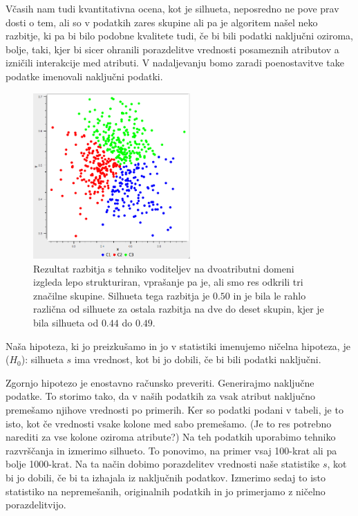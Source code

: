 Včasih nam tudi kvantitativna ocena, kot je silhueta, neposredno ne
pove prav dosti o tem, ali so v podatkih zares skupine ali pa je
algoritem našel neko razbitje, ki pa bi bilo podobne kvalitete tudi,
če bi bili podatki naključni oziroma, bolje, taki, kjer bi sicer
ohranili porazdelitve vrednosti posameznih atributov a izničili
interakcije med atributi. V nadaljevanju bomo zaradi poenostavitve
take podatke imenovali naključni podatki.

\begin{figure}[htbp]
\begin{center}
  \includegraphics[width=6cm]{slike/kmeans-wrong-scatter.png}
\caption{Rezultat razbitja s tehniko voditeljev na dvoatributni domeni
izgleda lepo strukturiran, vprašanje pa je, ali smo res odkrili tri
značilne skupine. Silhueta tega razbitja je $0.50$ in je bila le rahlo
različna od silhuete za ostala razbitja na dve do deset skupin, kjer
je bila silhueta od $0.44$ do $0.49$.}
\label{f-kmeans-hairball}
\end{center}
\end{figure}


Naša hipoteza, ki jo preizkušamo in jo v statistiki imenujemo ničelna
hipoteza, je ($H_0$): silhueta $s$ ima vrednost, kot bi jo dobili,
če bi bili podatki naključni.

Zgornjo hipotezo je enostavno računsko preveriti. Generirajmo naključne
podatke. To storimo tako, da v naših podatkih za vsak atribut
naključno premešamo njihove vrednosti po primerih. Ker so podatki
podani v tabeli, je to isto, kot če vrednosti vsake kolone med sabo
premešamo. (Je to res potrebno narediti za vse kolone oziroma
atribute?) Na teh podatkih uporabimo tehniko razvrščanja in izmerimo
silhueto. To ponovimo, na primer vsaj 100-krat ali pa bolje
1000-krat. Na ta način dobimo porazdelitev vrednosti naše statistike
$s$, kot bi jo dobili, če bi ta izhajala iz naključnih
podatkov. Izmerimo sedaj to isto statistiko na nepremešanih,
originalnih podatkih in jo primerjamo z ničelno porazdelitvijo.

